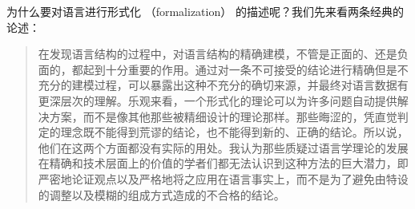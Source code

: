 为什么要对语言进行形式化 （formalization） 的描述呢？我们先来看两条经典的论述：
\begin{quote}
\label{quote-Chomsky-Formalisierung}%
在发现语言结构的过程中，对语言结构的精确建模，不管是正面的、还是负面的，都起到十分重要的作用。通过对一条不可接受的结论进行精确但是不充分的建模过程，可以暴露出这种不充分的确切来源，并最终对语言数据有更深层次的理解。乐观来看，一个形式化的理论可以为许多问题自动提供解决方案，而不是像其他那些被精细设计的理论那样。那些晦涩的，凭直觉判定的理念既不能得到荒谬的结论，也不能得到新的、正确的结论。所以说，他们在这两个方面都没有实际的用处。我认为那些质疑过语言学理论的发展在精确和技术层面上的价值的学者们都无法认识到这种方法的巨大潜力，即严密地论证观点以及严格地将之应用在语言事实上，而不是为了避免由特设的调整以及模糊的组成方式造成的不合格的结论。
\citep[]{Chomsky57a}
\end{quote}

